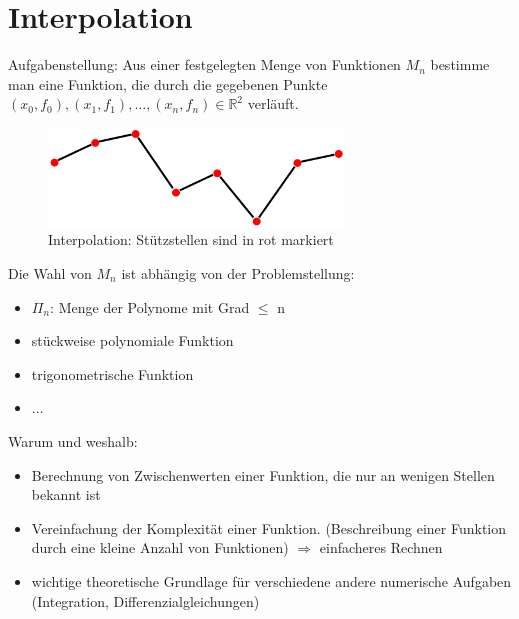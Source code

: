 \section{Interpolation\label{ch:interpolation}}
Aufgabenstellung: Aus einer festgelegten Menge von Funktionen $M_n$ 
bestimme man eine Funktion, die durch die gegebenen Punkte
$(x_0, f_0), (x_1, f_1), \ldots, (x_n, f_n) \in \mathbb{R}^2$ verläuft.

\begin{figure}[htbp]
  \centering
  \includegraphics[width=0.7\textwidth]{figures/interpolation.png}
  \caption{Interpolation: Stützstellen sind in rot markiert}
  \label{fig:interpolation}
\end{figure}

Die Wahl von $M_n$ ist abhängig von der Problemstellung:
\begin{itemize}
  \item $\Pi_n$: Menge der Polynome mit Grad $\leq$ n
  \item stückweise polynomiale Funktion
  \item trigonometrische Funktion
	\item $\ldots$
\end{itemize}
Warum und weshalb:
\begin{itemize}
  \item Berechnung von Zwischenwerten einer Funktion, die nur an wenigen 
    Stellen bekannt ist
  \item Vereinfachung der Komplexität einer Funktion. (Beschreibung
    einer Funktion durch eine kleine Anzahl von Funktionen) $\Rightarrow$
    einfacheres Rechnen
  \item wichtige theoretische Grundlage für verschiedene andere numerische
    Aufgaben (Integration, Differenzialgleichungen)
\end{itemize}

